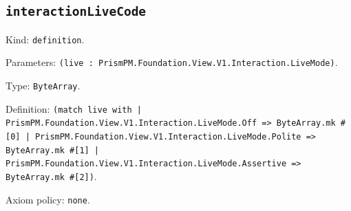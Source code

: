 \documentclass[11pt]{article}
\begin{document}
\subsection*{\texttt{interactionLiveCode}}
\noindent Kind: \texttt{definition}.\par
\noindent Parameters: \texttt{(live : PrismPM.Foundation.View.V1.Interaction.LiveMode)}.\par
\noindent Type: \texttt{ByteArray}.\par
\noindent Definition: \texttt{(match live with | PrismPM.Foundation.View.V1.Interaction.LiveMode.Off => ByteArray.mk \#[0] | PrismPM.Foundation.View.V1.Interaction.LiveMode.Polite => ByteArray.mk \#[1] | PrismPM.Foundation.View.V1.Interaction.LiveMode.Assertive => ByteArray.mk \#[2])}.\par
\noindent Axiom policy: \texttt{none}.\par
\end{document}

